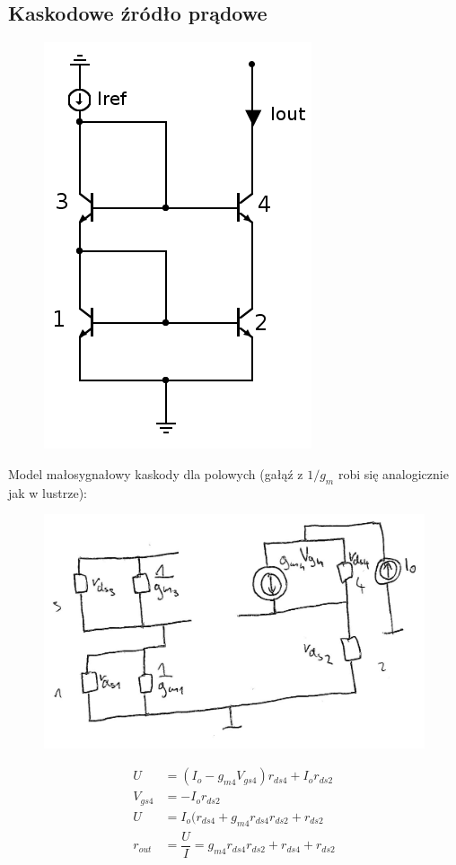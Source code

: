 \documentclass[10pt,a4paper]{article}
\begin{document}
\subsection{Kaskodowe źródło prądowe}
\begin{figure}[H]
\centering
\includegraphics[scale=0.5]{kaskoda}
\end{figure}

Model małosygnałowy kaskody dla polowych (gałąź z $1/g_{m}$ robi się analogicznie jak w lustrze):
\begin{figure}[H]
\centering
\includegraphics[scale=0.8]{kaskoda_wypr}
\end{figure}
\begin{align*}
U&=(I_o-g_{m4}V_{gs4})r_{ds4}+I_o r_{ds2} \\
V_{gs4}&=-I_o r_{ds2} \\
U&=I_o(r_{ds4}+g_{m4}r_{ds4}r_{ds2}+r_{ds2} \\
r_{out}&=\dfrac{U}{I}=g_{m4}r_{ds4}r_{ds2}+r_{ds4}+r_{ds2}
\end{align*}
\end{document}
